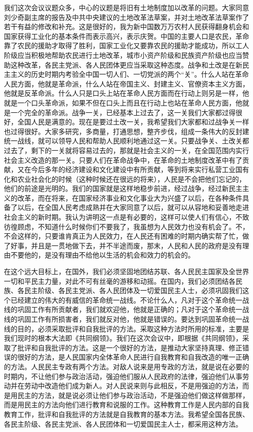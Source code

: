 我们这次会议议题众多，中心的议题是将旧有土地制度加以改革的问题。大家同意刘少奇副主席的报告及中共中央建议的土地改革法草案，并对土地改革法草案作了若干有益的修改和补充。这是很好的，我为新中国数万万农村人民获得翻身机会和国家获得工业化的基本条件而表示高兴，表示庆贺。中国的主要人口是农民，革命靠了农民的援助才取得了胜利，国家工业化又要靠农民的援助才能成功，所以工人阶级应当积极地帮助农民进行土地改革，城市小资产阶级和民族资产阶级也应当赞助这种改革，各民主党派、各人民团体更应当采取这种态度。战争和土改是在新民主主义的历史时期内考验全中国一切人们、一切党派的两个“关”。什么人站在革命人民方面，他就是革命派，什么人站在帝国主义、封建主义、官僚资本主义方面，他就是反革命派。什么人只是口头上站在革命人民方面而在行动上则另是一样，他就是一个口头革命派，如果不但在口头上而且在行动上也站在革命人民方面，他就是一个完全的革命派。战争一关，已经基本上过去了，这一关我们大家都过得很好，全国人民是满意的。现在是要过土改一关，我希望我们大家都和过战争关一样也过得很好。大家多研究，多商量，打通思想，整齐步伐，组成一条伟大的反封建统一战线，就可以领导人民和帮助人民顺利地通过这一关。只要战争关、土改关都过去了，剩下的一关就将容易过去的，那就是社会主义的一关，在全国范围内实行社会主义改造的那一关。只要人们在革命战争中，在革命的土地制度改革中有了贡献，又在今后多年的经济建设和文化建设中有所贡献，等到将来实行私营工业国有化和农业社会化的时候（这种时候还在很远的将来），人民是不会把他们忘记的，他们的前途是光明的。我们的国家就是这样地稳步前进，经过战争，经过新民主主义的改革，而在将来，在国家经济事业和文化事业大为兴盛了以后，在各种条件具备了以后，在全国人民考虑成熟并在大家同意了以后，就可以从容地和妥善地走进社会主义的新时期。我认为讲明这一点是有必要的，这样可以使人们有信心，不致彷徨顾虑，不知道什么时候你们不要我了，我虽想为人民效力也没有机会了。不，不会这样的，只要谁肯真正为人民效力，在人民还有困难的时期内确实帮了忙，做了好事，并且是一贯地做下去，并不半途而废，那末，人民和人民的政府是没有理由不要他的，是没有理由不给他以生活的机会和效力的机会的。

在这个远大目标上，在国外，我们必须坚固地团结苏联、各人民民主国家及全世界一切和平民主力量，对此不可有丝毫的游移和动摇。在国内，我们必须团结各民族、各民主阶级、各民主党派、各人民团体及一切爱国民主人士，必须巩固我们这个已经建立的伟大的有威信的革命统一战线。不论什么人，凡对于这个革命统一战线的巩固工作有所贡献者，我们就欢迎他，他就是正确的；凡对于这个革命统一战线的巩固工作有所损害者，我们就反对他，他就是错误的。要达到巩固革命统一战线的目的，必须采取批评和自我批评的方法。采取这种方法时所用的标准，主要是我们现时的根本大法即《共同纲领》。我们在这次会议中，即根据《共同纲领》，采取了批评和自我批评的方法。这是一个很好的方法，是推动大家坚持真理、修正错误的很好的方法，是人民国家内全体革命人民进行自我教育和自我改造的唯一正确的方法。人民民主专政有两个方法。对敌人说来是用专政的方法，就是说在必要的时期内，不让他们参与政治活动，强迫他们服从人民政府的法律，强迫他们从事劳动并在劳动中改造他们成为新人。对人民说来则与此相反，不是用强迫的方法，而是用民主的方法，就是说必须让他们参与政治活动，不是强迫他们做这样做那样，而是用民主的方法向他们进行教育和说服的工作。这种教育工作是人民内部的自我教育工作，批评和自我批评的方法就是自我教育的基本方法。我希望全国各民族、各民主阶级、各民主党派、各人民团体和一切爱国民主人士，都采用这种方法。


